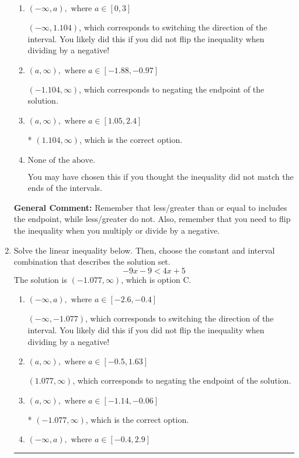 \documentclass{extbook}[14pt]
\newcommand{\litem}[1]{\item #1

\rule{\textwidth}{0.4pt}}
\begin{document}
\begin{enumerate}
{\begin{enumerate}[label=\Alph*.]
 $(-\infty, -1.104)$, which corresponds to switching the direction of the interval AND negating the endpoint. You likely did this if you did not flip the inequality when dividing by a negative as well as not moving values over to a side properly.
\item \( (-\infty, a), \text{ where } a \in [0, 3] \)

 $(-\infty, 1.104)$, which corresponds to switching the direction of the interval. You likely did this if you did not flip the inequality when dividing by a negative!
\item \( (a, \infty), \text{ where } a \in [-1.88, -0.97] \)

 $(-1.104, \infty)$, which corresponds to negating the endpoint of the solution.
\item \( (a, \infty), \text{ where } a \in [1.05, 2.4] \)

* $(1.104, \infty)$, which is the correct option.
\item \( \text{None of the above}. \)

You may have chosen this if you thought the inequality did not match the ends of the intervals.
\end{enumerate}

\textbf{General Comment:} Remember that less/greater than or equal to includes the endpoint, while less/greater do not. Also, remember that you need to flip the inequality when you multiply or divide by a negative.
}
\litem{
Solve the linear inequality below. Then, choose the constant and interval combination that describes the solution set.
\[ -9x -9 < 4x + 5 \]The solution is \( (-1.077, \infty) \), which is option C.\begin{enumerate}[label=\Alph*.]
\item \( (-\infty, a), \text{ where } a \in [-2.6, -0.4] \)

 $(-\infty, -1.077)$, which corresponds to switching the direction of the interval. You likely did this if you did not flip the inequality when dividing by a negative!
\item \( (a, \infty), \text{ where } a \in [-0.5, 1.63] \)

 $(1.077, \infty)$, which corresponds to negating the endpoint of the solution.
\item \( (a, \infty), \text{ where } a \in [-1.14, -0.06] \)

* $(-1.077, \infty)$, which is the correct option.
\item \( (-\infty, a), \text{ where } a \in [-0.4, 2.9] \)


\end{enumerate}}
\end{enumerate}
\end{document}

